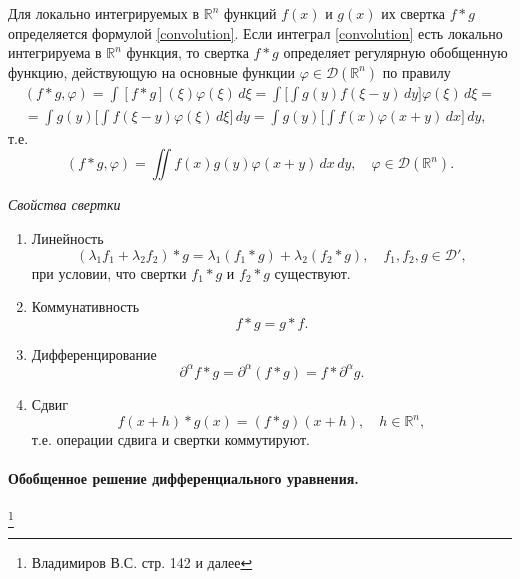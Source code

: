 Для локально интегрируемых в $\mathbb{R}^{n}$ функций $f(x)$ и $g(x)$ их свертка $f \ast g$ определяется формулой \eqref{convolution}. Если интеграл \eqref{convolution} есть локально интегрируема в $\mathbb{R}^n$ функция, то свертка $f \ast g$ определяет регулярную обобщенную функцию, действующую на основные функции $\varphi \in \mathcal{D}(\mathbb{R}^n)$ по правилу
\begin{align*}
	(f \ast g, \varphi) = \int [f \ast g](\xi)\varphi(\xi) \, d\xi = \int\Big[\int g(y) f(\xi - y) \, dy\Big] \varphi(\xi) \, d\xi = \\
	= \int g(y) \Big[\int f(\xi - y)\varphi(\xi) \, d\xi\Big] \, dy = \int g(y) \Big[\int f(x) \varphi(x + y) \, dx\Big] \, dy,
\end{align*}
т.е.
\begin{equation*}
	(f \ast g, \varphi) = \iint f(x) g(y) \varphi(x + y) \, dx \, dy, \quad \varphi \in \mathcal{D}(\mathbb{R}^n).
\end{equation*}

\textit{Свойства свертки}

\begin{enumerate}
	\item Линейность
	\begin{equation*}
		(\lambda_1 f_1 + \lambda_2 f_2) \ast g = \lambda_1 (f_1 \ast g) + \lambda_2 (f_2 \ast g), \quad f_1, f_2, g \in \mathcal{D}',
	\end{equation*}
	при условии, что свертки $f_1 \ast g$ и $f_2 \ast g$ существуют.
	
	\item Коммунативность
	\begin{equation*}
		f \ast g = g \ast f.
	\end{equation*}
	
	\item Дифференцирование
	\begin{equation*}
		\partial^{\alpha} f \ast g = \partial^{\alpha}(f \ast g) = f \ast \partial^{\alpha} g.
	\end{equation*}
	
	\item Сдвиг
	\begin{equation*}
		f(x + h) \ast g(x) = (f \ast g)(x + h), \quad h \in \mathbb{R}^n,
	\end{equation*}
	т.е. операции сдвига и свертки коммутируют.
\end{enumerate}

\paragraph{Обобщенное решение дифференциального уравнения.}\footnote{Владимиров В.С. стр. 142 и далее}

